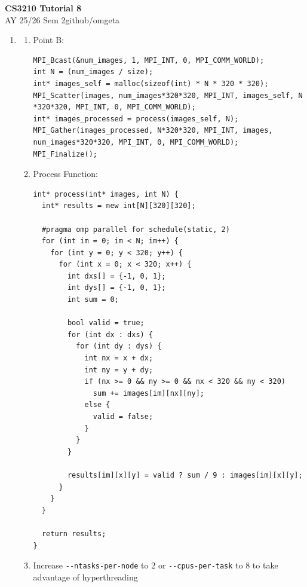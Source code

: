 \documentclass[12pt, a4paper]{article}
\newcommand{\mytitle}{CS3210 Tutorial 8}
\newcommand{\myauthor}{github/omgeta}
\newcommand{\mydate}{AY 25/26 Sem 2}
\begin{document}
\raggedright
\normalsize
\begin{center}
{\normalsize{\textbf{\mytitle}}} \\
{\footnotesize{\mydate\hspace{2pt}\textemdash\hspace{2pt}\myauthor}}
\end{center}
\begin{enumerate}
  \item 
    \begin{enumerate}
      \item Point B:
        \begin{lstlisting}
MPI_Bcast(&num_images, 1, MPI_INT, 0, MPI_COMM_WORLD);
int N = (num_images / size);
int* images_self = malloc(sizeof(int) * N * 320 * 320);
MPI_Scatter(images, num_images*320*320, MPI_INT, images_self, N *320*320, MPI_INT, 0, MPI_COMM_WORLD);
int* images_processed = process(images_self, N);
MPI_Gather(images_processed, N*320*320, MPI_INT, images, num_images*320*320, MPI_INT, 0, MPI_COMM_WORLD);
MPI_Finalize();
        \end{lstlisting}

      \item Process Function:
        \begin{lstlisting}
int* process(int* images, int N) {
  int* results = new int[N][320][320];

  #pragma omp parallel for schedule(static, 2)
  for (int im = 0; im < N; im++) {
    for (int y = 0; y < 320; y++) {
      for (int x = 0; x < 320; x++) {
        int dxs[] = {-1, 0, 1};
        int dys[] = {-1, 0, 1};
        int sum = 0;

        bool valid = true;
        for (int dx : dxs) {
          for (int dy : dys) {
            int nx = x + dx;
            int ny = y + dy;
            if (nx >= 0 && ny >= 0 && nx < 320 && ny < 320)
              sum += images[im][nx][ny];
            else {
              valid = false;
            }
          }
        }
        
        results[im][x][y] = valid ? sum / 9 : images[im][x][y];
      }
    }
  }

  return results;
}
        \end{lstlisting}

      \item Increase \lstinline|--ntasks-per-node| to 2 or \lstinline|--cpus-per-task| to 8 to take advantage of hyperthreading
    \end{enumerate}
\end{enumerate}
\end{document}
